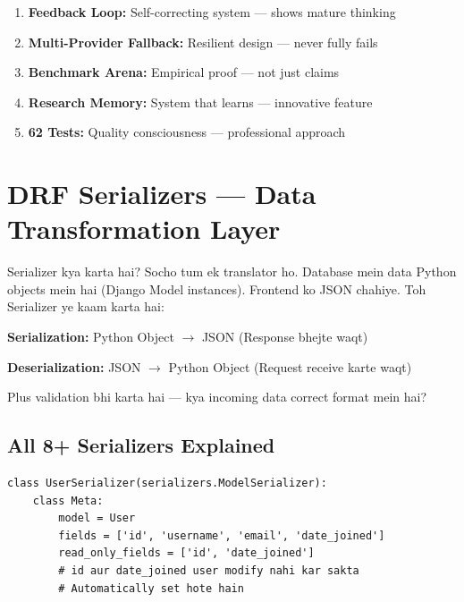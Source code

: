 \documentclass[11pt,a4paper,twoside]{report}
\begin{document}
\begin{enumerate}
    \item \textbf{Feedback Loop:} Self-correcting system --- shows mature thinking
    \item \textbf{Multi-Provider Fallback:} Resilient design --- never fully fails
    \item \textbf{Benchmark Arena:} Empirical proof --- not just claims
    \item \textbf{Research Memory:} System that learns --- innovative feature
    \item \textbf{62 Tests:} Quality consciousness --- professional approach
\end{enumerate}



\chapter{DRF Serializers --- Data Transformation Layer}

\begin{storybox}{Serializer kya karta hai?}
Socho tum ek translator ho. Database mein data Python objects mein hai (Django Model instances). Frontend ko JSON chahiye. Toh Serializer ye kaam karta hai:

\textbf{Serialization:} Python Object $\rightarrow$ JSON (Response bhejte waqt)

\textbf{Deserialization:} JSON $\rightarrow$ Python Object (Request receive karte waqt)

Plus validation bhi karta hai --- kya incoming data correct format mein hai?
\end{storybox}

\section{All 8+ Serializers Explained}

\begin{lstlisting}[style=pythonstyle,caption={serializers.py --- UserSerializer}]
class UserSerializer(serializers.ModelSerializer):
    class Meta:
        model = User
        fields = ['id', 'username', 'email', 'date_joined']
        read_only_fields = ['id', 'date_joined']
        # id aur date_joined user modify nahi kar sakta
        # Automatically set hote hain
\end{lstlisting}
\end{document}
